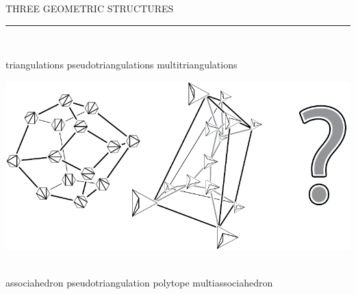 \documentclass[12pt,titlepage,landscape,a4paper]{article}
\newcommand{\textemoyen}{\fontsize{23}{27}\selectfont}
\newenvironment{slide}[1]
{
\newpage
\begin{center}
{\blue \textemoyen \uppercase{#1}}\\
\end{center}
\vspace{-1cm}
\rule{\textwidth}{0.5 pt}\\
\vspace{-.8cm}
}
{\vspace*{-3cm}}
\newcommand{\violet}{\color{violet}} %
\newcommand{\blue}{\color{blue}} %
\newcommand{\papier}[1]{{\violet\fontsize{15}{20}\selectfont #1}} %
\renewcommand{\emph}[1]{\uline{#1}}
\begin{document}
\begin{slide}{Three geometric structures}

\hspace{1.6cm} triangulations \hspace{3.4cm} pseudotriangulations \hspace{2.5cm} multitriangulations
\begin{center}\includegraphics[width=.95\textwidth]{geometricStructures4}\hspace*{1.5cm}~\end{center}
\hspace{1.5cm} associahedron \hspace{2.6cm} pseudotriangulation polytope \hspace{1.2cm} multiassociahedron

\vspace{-1cm}
\end{slide}

%
%
\end{document}
